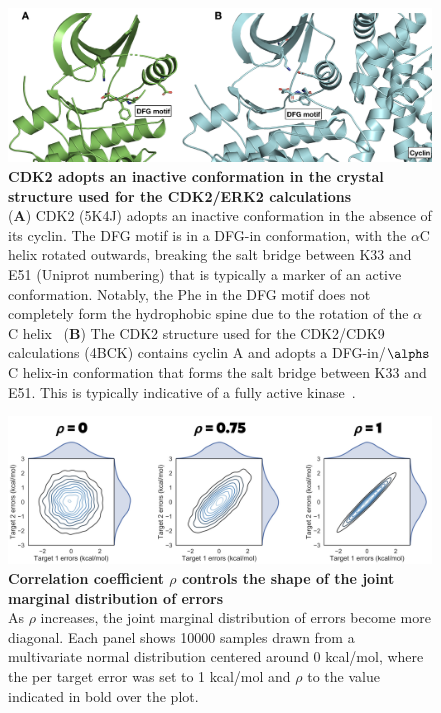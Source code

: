 \documentclass[9pt,lineno]{elife-modified} %
\begin{document}
\begin{figure}[h]
\begin{fullwidth}
\begin{centering}
\includegraphics[width=1.0\linewidth]{figures/supp_figure1.png}
\end{centering}
\caption{
\label{fig:sup-figure-1}
{\bf CDK2 adopts an inactive conformation in the crystal structure used for the CDK2/ERK2 calculations} \\
({\bf A}) CDK2 (5K4J) adopts an inactive conformation in the absence of its cyclin. The DFG motif is in a DFG-in conformation, with the $\alpha$C helix rotated outwards, breaking the salt bridge between K33 and E51 (Uniprot numbering) that is typically a marker of an active conformation. Notably, the Phe in the DFG motif does not completely form the hydrophobic spine due to the rotation of the $\alpha$C helix~\citep{Hu:2015kh}
({\bf B}) The CDK2 structure used for the CDK2/CDK9 calculations (4BCK) contains cyclin A and adopts a DFG-in/$\alphs$C helix-in conformation that forms the salt bridge between K33 and E51. This is typically indicative of a fully active kinase~\citep{Huse2002-ml,Hari:2013dp,TREIBER2013745}. 
}
\end{fullwidth}
\end{figure}

\begin{figure}[h]
\begin{fullwidth}
\begin{centering}
\includegraphics[width=1.0\linewidth]{figures/supp_2.png}
\end{centering}
\caption{
\label{fig:sup-figure-2}
{\bf Correlation coefficient $\rho$ controls the shape of the joint marginal distribution of errors} \\
As $\rho$ increases, the joint marginal distribution of errors become more diagonal. Each panel shows 10000 samples drawn from a multivariate normal distribution centered around 0 kcal/mol, where the per target error was set to 1 kcal/mol and $\rho$ to the value indicated in bold over the plot. 
}
\end{fullwidth}
\end{figure}




\end{document}
